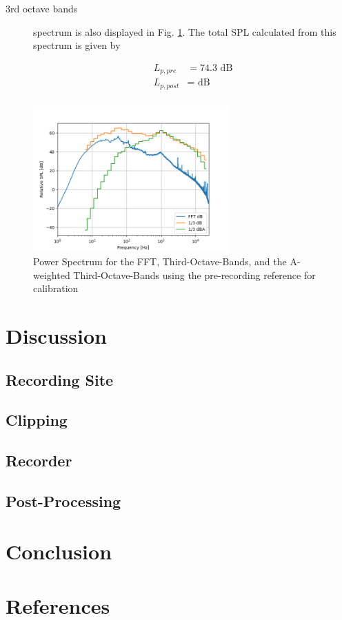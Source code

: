 \documentclass[twocolumn]{article}
\begin{document}
\begin{description}
\item[3rd octave bands] spectrum is also displayed in Fig. \ref{fig:power_spectrum}.
    The total SPL calculated from this spectrum is given by

\begin{equation}
\begin{align}
    L_{p,pre} & = 74.3 \textrm{ dB} \\
    L_{p,post} & = \textrm{ dB} \\
\end{align}
\end{equation}

\end{description}
 
\begin{figure}[!h]
    \centering
    \includegraphics[width=75mm]{./Images/spectrum_plot_step.png}
    \caption{Power Spectrum for the FFT, Third-Octave-Bands, and the A-weighted Third-Octave-Bands using the 
    pre-recording reference for calibration}
    \label{fig:power_spectrum}
\end{figure}



\section{Discussion}
\subsection{Recording Site}

\subsection{Clipping}

\subsection{Recorder}

\subsection{Post-Processing}

\section{Conclusion}

\section{References}
\end{document}
